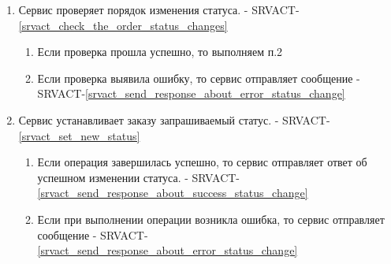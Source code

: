     \begin{alg} \label{alg_order_status_processing} \mbox{}

         \begin{enumerate}

           \item Сервис проверяет порядок изменения статуса. - SRVACT-\ref{srvact_check_the_order_status_changes}

             	\begin{enumerate}

               	\item Если проверка прошла успешно, то выполняем п.2
            
             		\item Если проверка выявила ошибку, то сервис отправляет сообщение - SRVACT-\ref{srvact_send_response_about_error_status_change}

             	\end{enumerate}

           \item Сервис устанавливает заказу запрашиваемый статус. - SRVACT-\ref{srvact_set_new_status}

             	\begin{enumerate}

               	\item Если операция завершилась успешно, то сервис отправляет ответ об успешном изменении статуса. - SRVACT-\ref{srvact_send_response_about_success_status_change}
            
             		\item Если при выполнении операции возникла ошибка, то сервис отправляет сообщение - SRVACT-\ref{srvact_send_response_about_error_status_change}

             	\end{enumerate}

         \end{enumerate}

         \end{alg}

